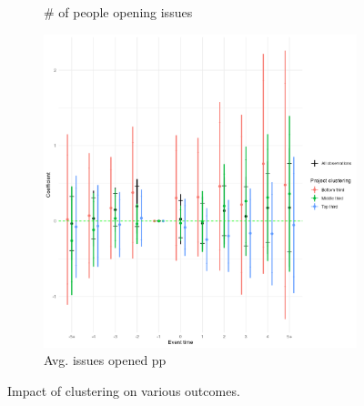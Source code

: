 \documentclass[12pt,notitlepage]{article}
\begin{document}
\begin{itemize}
\begin{figure}[htbp]
\begin{subfigure}[b]{0.32\textwidth}
    \caption{\# of people opening issues}
    \label{fig:clustering_issue_cc}
  \end{subfigure}
  \begin{subfigure}[b]{0.32\textwidth}
    \centering
    \includegraphics[width=\textwidth]{temp/project_clus_issues_avg_combined_2p_back_bin_third.png}
    \caption{Avg. issues opened pp}
    \label{fig:clustering_issue_cc}
  \end{subfigure}
  \caption{Impact of clustering on various outcomes.}
  \label{fig:clustering}
\end{figure}


\end{itemize}
\end{document}
